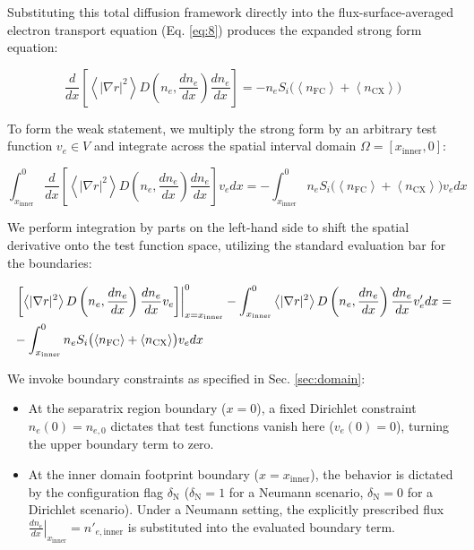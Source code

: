 \documentclass[twocolumn,secnumarabic,amssymb, nobibnotes, aps, prd]{revtex4-2}
\renewcommand{\ne}{n_{e}}  %
\newcommand{\nfc}{n_{\mathrm{FC}}}
\newcommand{\ncx}{n_{\mathrm{CX}}}
\newcommand{\Si}{S_{i}}
\newcommand{\fsa}[1]{\left\langle #1 \right\rangle}
\newcommand{\gradrsq}{\fsa{|\nabla r|^{2}}}
\newcommand{\xin}{x_{\mathrm{inner}}}
\begin{document}
Substituting this total diffusion framework directly into the flux-surface-averaged electron transport equation (Eq. \ref{eq:8}) produces the expanded strong form equation:
\begin{widetext}
\begin{equation}
\frac{d}{dx}\left[\gradrsq D\left(\ne, \frac{d\ne}{dx}\right) \frac{d\ne}{dx}\right] = -\ne\Si\bigl(\fsa{\nfc} + \fsa{\ncx}\bigr)
\end{equation}
\end{widetext}

To form the weak statement, we multiply the strong form by an arbitrary test function $v_e \in V$ and integrate across the spatial interval domain $\Omega = [\xin, 0]$:
\begin{widetext}
\begin{equation}
\int_{\xin}^{0} \frac{d}{dx}\left[\gradrsq D\left(\ne, \frac{d\ne}{dx}\right) \frac{d\ne}{dx}\right] v_e  dx = -\int_{\xin}^{0} \ne\Si\bigl(\fsa{\nfc} + \fsa{\ncx}\bigr) v_e dx
\end{equation}
\end{widetext}

We perform integration by parts on the left-hand side to shift the spatial derivative onto the test function space, utilizing the standard evaluation bar for the boundaries:
\begin{widetext}
\begin{align}
&\left. \left[\gradrsq D\left(\ne, \frac{d\ne}{dx}\right) \frac{d\ne}{dx} v_e\right] \right|_{x=\xin}^{0} - \int_{\xin}^{0} \gradrsq D\left(\ne, \frac{d\ne}{dx}\right) \frac{d\ne}{dx} v_e' dx = 
\notag \\ & -\int_{\xin}^{0} \ne\Si\bigl(\fsa{\nfc} + \fsa{\ncx}\bigr) v_e  dx
\end{align}
\end{widetext}

We invoke boundary constraints as specified in Sec. \ref{sec:domain}:
\begin{itemize}
\item At the separatrix region boundary ($x=0$), a fixed Dirichlet constraint $\ne(0) = n_{e,0}$ dictates that test functions vanish here ($v_e(0) = 0$), turning the upper boundary term to zero.
\item At the inner domain footprint boundary ($x=\xin$), the behavior is dictated by the configuration flag $\delta_{\mathrm{N}}$ ($\delta_{\mathrm{N}}=1$ for a Neumann scenario, $\delta_{\mathrm{N}}=0$ for a Dirichlet scenario). Under a Neumann setting, the explicitly prescribed flux $\left.\frac{d\ne}{dx}\right|_{\xin} = n'_{e,\mathrm{inner}}$ is substituted into the evaluated boundary term.
\end{itemize}
\end{document}
